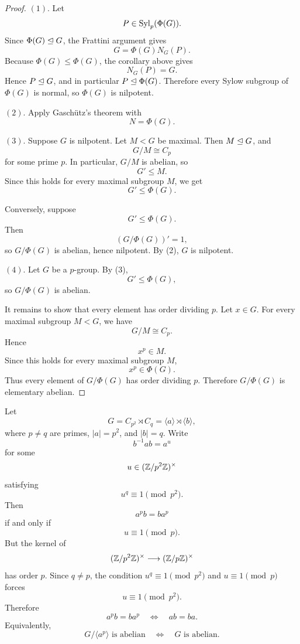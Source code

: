 \begin{proof}
\((1)\).
Let
\[
    P\in \operatorname{Syl}_p(\Phi(G)).
\]
Since \(\Phi(G)\trianglelefteq G\), the Frattini argument gives
\[
    G=\Phi(G)N_G(P).
\]
Because \(\Phi(G)\leq \Phi(G)\), the corollary above gives
\[
    N_G(P)=G.
\]
Hence \(P\trianglelefteq G\), and in particular \(P\trianglelefteq \Phi(G)\). Therefore every
Sylow subgroup of \(\Phi(G)\) is normal, so \(\Phi(G)\) is nilpotent.

\((2)\).
Apply Gasch\"utz's theorem with
\[
    N=\Phi(G).
\]

\((3)\).
Suppose \(G\) is nilpotent. Let \(M<G\) be maximal. Then \(M\trianglelefteq G\), and
\[
    G/M\cong C_p
\]
for some prime \(p\). In particular, \(G/M\) is abelian, so
\[
    G'\leq M.
\]
Since this holds for every maximal subgroup \(M\), we get
\[
    G'\leq \Phi(G).
\]

Conversely, suppose
\[
    G'\leq \Phi(G).
\]
Then
\[
    (G/\Phi(G))'=1,
\]
so \(G/\Phi(G)\) is abelian, hence nilpotent. By (2), \(G\) is nilpotent.

\((4)\).
Let \(G\) be a \(p\)-group. By (3),
\[
    G'\leq \Phi(G),
\]
so \(G/\Phi(G)\) is abelian.

It remains to show that every element has order dividing \(p\). Let \(x\in G\).
For every maximal subgroup \(M<G\), we have
\[
    G/M\cong C_p.
\]
Hence
\[
    x^p\in M.
\]
Since this holds for every maximal subgroup \(M\),
\[
    x^p\in \Phi(G).
\]
Thus every element of \(G/\Phi(G)\) has order dividing \(p\). Therefore
\(G/\Phi(G)\) is elementary abelian.
\end{proof}

\begin{example}
Let
\[
    G=C_{p^2}\rtimes C_q=\langle a\rangle\rtimes \langle b\rangle,
\]
where \(p\neq q\) are primes, \(|a|=p^2\), and \(|b|=q\). Write
\[
    b^{-1}ab=a^u
\]
for some
\[
    u\in (\mathbb{Z}/p^2\mathbb{Z})^\times
\]
satisfying
\[
    u^q\equiv 1\pmod{p^2}.
\]
Then
\[
    a^p b=ba^p
\]
if and only if
\[
    u\equiv 1\pmod p.
\]
But the kernel of
\[
    (\mathbb{Z}/p^2\mathbb{Z})^\times\longrightarrow (\mathbb{Z}/p\mathbb{Z})^\times
\]
has order \(p\). Since \(q\neq p\), the condition \(u^q\equiv 1\pmod{p^2}\) and
\(u\equiv 1\pmod p\) forces
\[
    u\equiv 1\pmod{p^2}.
\]
Therefore
\[
    a^p b=ba^p
    \quad\Longleftrightarrow\quad
    ab=ba.
\]
Equivalently,
\[
    G/\langle a^p\rangle\text{ is abelian}
    \quad\Longleftrightarrow\quad
    G\text{ is abelian}.
\]
\end{example}

